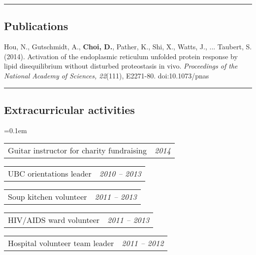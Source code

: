 \documentclass[10pt,letterpaper]{article}
\makeatletter
\newenvironment{indentsection}[1]%
{\begin{list}{}%
	{\setlength{\leftmargin}{#1}}%
	\item[]%
}
{\end{list}}
\newcommand{\headerrow}[2]
{\begin{tabular*}{\linewidth}{l@{\extracolsep{\fill}}r}
	#1 &
	#2 \\
\end{tabular*}}
\makeatother
\begin{document}
\hrule
\vspace{-0.4em}

\subsection*{Publications}

\begin{indentsection}{\parindent}
\begin{description*}
	\item
	Hou, N., Gutschmidt, A., \textbf{Choi, D.}, Pather, K., Shi, X., Watts, J., ... Taubert, S. 
	(2014). Activation of the endoplasmic reticulum unfolded protein response by 
	lipid disequilibrium without disturbed proteostasis in vivo. \textit{Proceedings of the 
	National Academy of Sciences, 22}(111), E2271-80. doi:10.1073/pnas
\end{description*}
\end{indentsection}
\hrule
\vspace{-0.4em}

\subsection*{Extracurricular activities}

\begin{itemize*}
	\parskip=0.1em
	\item 
	\headerrow
		{{Guitar instructor for charity fundraising}}
		{\emph{2014}}
	\item 
	\headerrow
		{{UBC orientations leader}}
		{\emph{2010 -- 2013}}
	\item 
	\headerrow
		{{Soup kitchen volunteer}}
		{\emph{2011 -- 2013}}
	\item 
	\headerrow
		{{HIV/AIDS ward volunteer}}
		{\emph{2011 -- 2013}}
	\item 
	\headerrow
		{{Hospital volunteer team leader}}
		{\emph{2011 -- 2012}}
\end{itemize*}
\vspace{-0.4em}
\end{document}
